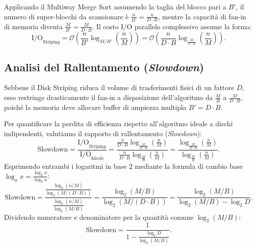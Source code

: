 Applicando il Multiway Merge Sort assumendo la taglia del blocco pari a $B'$, il numero di super-blocchi da scansionare è $\frac{n}{B'} = \frac{n}{D \cdot B}$, mentre la capacità di fan-in di memoria diventa $\frac{M}{B'} = \frac{M}{D \cdot B}$. Il costo I/O parallelo complessivo assume la forma:
\begin{equation}
  \mathrm{I/O}_{\text{Striping}} = \mathcal{O}\left(\frac{n}{B'} \log_{M/B'}\left(\frac{n}{M}\right)\right) = \mathcal{O}\left(\frac{n}{D \cdot B} \log_{\frac{M}{D \cdot B}}\left(\frac{n}{M}\right)\right).
\end{equation}

\FloatBarrier
\subsection{Analisi del Rallentamento (\texorpdfstring{\emph{Slowdown}}{Slowdown})}
\label{subsec:striping-slowdown}

Sebbene il Disk Striping riduca il volume di trasferimenti fisici di un fattore $D$, esso restringe drasticamente il fan-in a disposizione dell'algoritmo da $\frac{M}{B}$ a $\frac{M}{D \cdot B}$, poiché la memoria deve allocare buffer di ampiezza multipla $B' = D \cdot B$.

Per quantificare la perdita di efficienza rispetto all'algoritmo ideale a dischi indipendenti, valutiamo il rapporto di rallentamento (\textit{Slowdown}):
\begin{equation}
  \text{Slowdown} = \frac{\mathrm{I/O}_{\text{Striping}}}{\mathrm{I/O}_{\text{Ideale}}}
  = \frac{\displaystyle \frac{n}{D \cdot B} \log_{\frac{M}{D \cdot B}}\left(\frac{n}{M}\right)}{\displaystyle \frac{n}{D \cdot B} \log_{\frac{M}{B}}\left(\frac{n}{M}\right)}
  = \frac{\log_{\frac{M}{D \cdot B}}\left(\frac{n}{M}\right)}{\log_{\frac{M}{B}}\left(\frac{n}{M}\right)}.
\end{equation}
Esprimendo entrambi i logaritmi in base $2$ mediante la formula di cambio base $\log_a x = \frac{\log_2 x}{\log_2 a}$:
\begin{equation}
  \text{Slowdown} = \frac{\displaystyle \frac{\log_2(n / M)}{\log_2(M / (D \cdot B))}}{\displaystyle \frac{\log_2(n / M)}{\log_2(M / B)}}
  = \frac{\log_2(M / B)}{\log_2(M / (D \cdot B))}
  = \frac{\log_2(M / B)}{\log_2(M / B) - \log_2 D}.
\end{equation}
Dividendo numeratore e denominatore per la quantità comune $\log_2(M / B)$:
\begin{equation}
  \text{Slowdown} = \frac{1}{\displaystyle 1 - \frac{\log_2 D}{\log_2(M / B)}}.
  \label{eq:slowdown-formula}
\end{equation}


